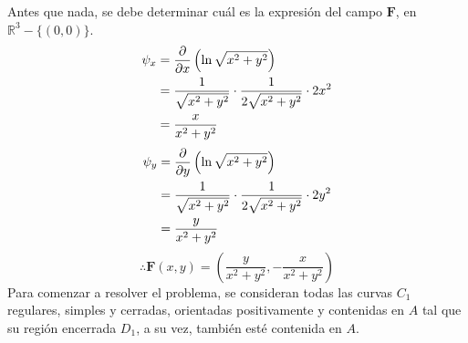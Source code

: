 \newpage
\begin{solution}

    Antes que nada, se debe determinar cuál es la expresión del campo $\boldsymbol{F}$, en $\mathbb{R}^3-\{(0,0)\}$.
    \begin{align*}
        \psi_x&=\frac{\partial}{\partial x}\left(\ln{\sqrt{x^2+y^2}}\right)\\
        &=\frac{1}{\sqrt{x^2+y^2}} \cdot \frac{1}{2\sqrt{x^2+y^2}} \cdot 2x^2\\
        &=\frac{x}{x^2+y^2}
    \end{align*}
    \begin{align*}
        \psi_y&=\frac{\partial}{\partial y}\left(\ln{\sqrt{x^2+y^2}}\right)\\
        &=\frac{1}{\sqrt{x^2+y^2}} \cdot \frac{1}{2\sqrt{x^2+y^2}} \cdot 2y^2\\
        &=\frac{y}{x^2+y^2}
    \end{align*}
    \begin{equation*}
        \therefore \boldsymbol{F}(x,y)= \left(\frac{y}{x^2+y^2}, -\frac{x}{x^2+y^2}\right)
    \end{equation*}
    Para comenzar a resolver el problema, se consideran todas las curvas $C_1$ regulares, simples y cerradas, orientadas positivamente
    y contenidas en $A$ tal que su región encerrada $D_1$, a su vez, también esté contenida en $A$. 
    \begin{center}
\end{center}
\end{solution}
